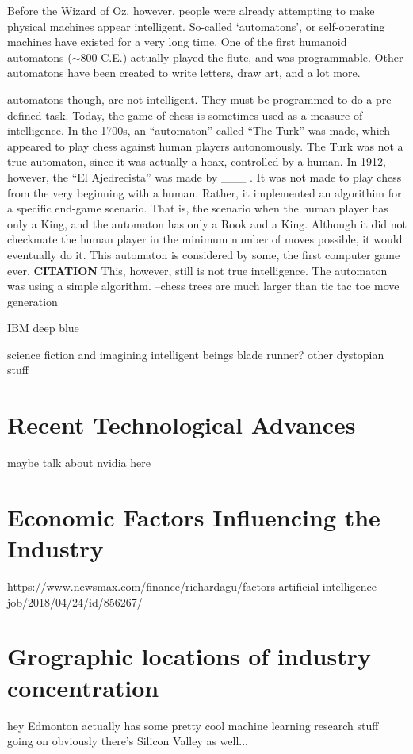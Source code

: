 \documentclass[letterpaper,12pt]{article}
\begin{document}
Before the Wizard of Oz, however, people were already attempting to make physical machines
appear intelligent. So-called `automatons', or self-operating machines have existed for
a very long time. One of the first humanoid automatons ($\sim$800 C.E.) actually played the flute, and was programmable.\cite{automaton}
Other automatons have been created to write letters, draw art, and a lot more.

automatons though, are not intelligent.
They must be programmed to do a pre-defined task.
Today, the game of chess is sometimes used as a measure of intelligence.
In the 1700s, an ``automaton'' called ``The Turk'' was made, which appeared to play chess
against human players autonomously\cite{turk}. The Turk was not a true automaton, since
it was actually a hoax, controlled by a human. In 1912, however, the ``El Ajedrecista''
was made by ___ \cite{actualchessmachine}. It was not made to play chess from the
very beginning with a human. Rather, it implemented an algorithim for a
specific end-game scenario. That is, the scenario when the human player has
only a King, and the automaton has only a Rook and a King. Although it did not
checkmate the human player in the minimum number of moves possible, it would
eventually do it.
This automaton is considered by some, the first computer game ever. \textbf{CITATION}
This, however, still is not true intelligence. The automaton was using a simple algorithm.
--chess trees are much larger than tic tac toe
move generation

IBM deep blue

science fiction and imagining intelligent beings
blade runner?
other dystopian stuff



\section{Recent Technological Advances}
maybe talk about nvidia here

\section{Economic Factors Influencing the Industry}
https://www.newsmax.com/finance/richardagu/factors-artificial-intelligence-job/2018/04/24/id/856267/

\section{Grographic locations of industry concentration}
hey Edmonton actually has some pretty cool machine learning research stuff
going on
obviously there's Silicon Valley as well...
\end{document}
